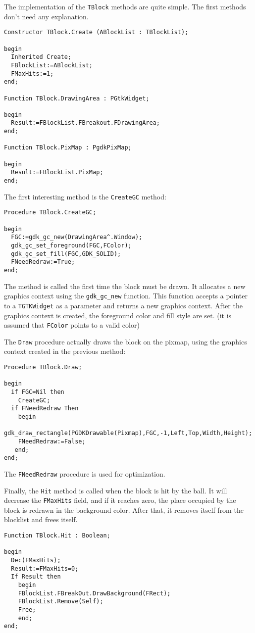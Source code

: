 \documentclass[10pt]{article}
\newcommand{\var}[1]{\texttt{#1}}
\begin{document}
The implementation of the \var{TBlock} methods are quite simple. The first
methods don't need any explanation.
\begin{verbatim}
Constructor TBlock.Create (ABlockList : TBlockList);

begin
  Inherited Create;
  FBlockList:=ABlockList;
  FMaxHits:=1;
end;

Function TBlock.DrawingArea : PGtkWidget;

begin
  Result:=FBlockList.FBreakout.FDrawingArea;
end;

Function TBlock.PixMap : PgdkPixMap; 

begin
  Result:=FBlockList.PixMap;
end;
\end{verbatim}
The first interesting method is the \var{CreateGC} method:
\begin{verbatim}
Procedure TBlock.CreateGC;

begin
  FGC:=gdk_gc_new(DrawingArea^.Window);
  gdk_gc_set_foreground(FGC,FColor);
  gdk_gc_set_fill(FGC,GDK_SOLID);
  FNeedRedraw:=True;
end;
\end{verbatim}
The method is called the first time the block must be drawn. It allocates a
new graphics context using the \var{gdk\_gc\_new} function. This function
accepts a pointer to a \var{TGTKWidget} as a parameter and returns a new
graphics context. After the graphics context is created, the foreground
color and fill style are set. (it is assumed that \var{FColor} points
to a valid color)

The \var{Draw} procedure actually draws the block on the pixmap, using 
the graphics context created in the previous method:
\begin{verbatim}
Procedure TBlock.Draw;

begin
  if FGC=Nil then
    CreateGC;
  if FNeedRedraw Then
    begin
    gdk_draw_rectangle(PGDKDrawable(Pixmap),FGC,-1,Left,Top,Width,Height);
    FNeedRedraw:=False;
   end;
end;
\end{verbatim}
The \var{FNeedRedraw} procedure is used for optimization.

Finally, the \var{Hit} method is called when the block is hit by the ball.
It will decrease the \var{FMaxHits} field, and if it reaches zero, the 
place occupied by the block is redrawn in the background color. After that,
it removes itself from the blocklist and frees itself.
\begin{verbatim}
Function TBlock.Hit : Boolean;

begin
  Dec(FMaxHits);
  Result:=FMaxHits=0;
  If Result then
    begin
    FBlockList.FBreakOut.DrawBackground(FRect);
    FBlockList.Remove(Self);
    Free;
    end;
end;
\end{verbatim}
\end{document}
